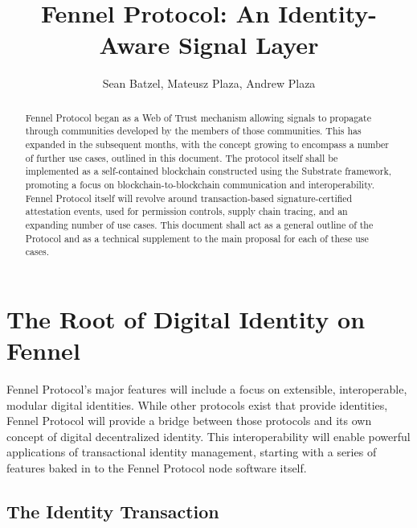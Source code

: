 \documentclass[]{article}
\title{Fennel Protocol: An Identity-Aware Signal Layer}
\author{Sean Batzel, Mateusz Plaza, Andrew Plaza}
\begin{document}
\maketitle
\begin{abstract}
Fennel Protocol began as a Web of Trust mechanism allowing signals to propagate through communities developed by the members of those communities. This has expanded in the subsequent months, with the concept growing to encompass a number of further use cases, outlined in this document. The protocol itself shall be implemented as a self-contained blockchain constructed using the Substrate framework, promoting a focus on blockchain-to-blockchain communication and interoperability. Fennel Protocol itself will revolve around transaction-based signature-certified attestation events, used for permission controls, supply chain tracing, and an expanding number of use cases. This document shall act as a general outline of the Protocol and as a technical supplement to the main proposal for each of these use cases.
\end{abstract}
\clearpage

\tableofcontents

\listoffigures
\listoftables
\clearpage

\section{The Root of Digital Identity on Fennel}
\label{scrivauto:10}

Fennel Protocol's major features will include a focus on extensible, interoperable, modular digital identities. While other protocols exist that provide identities, Fennel Protocol will provide a bridge between those protocols and its own concept of digital decentralized identity. This interoperability will enable powerful applications of transactional identity management, starting with a series of features baked in to the Fennel Protocol node software itself.

\subsection{The Identity Transaction}
\label{scrivauto:11}
\end{document}
